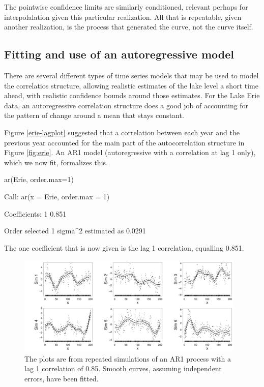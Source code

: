 \documentclass{tufte-book}\usepackage[]{graphicx}\usepackage[]{color}
\begin{document}
The pointwise confidence limits are similarly conditioned, relevant
perhaps for interpolalation given this particular realization.
All that is repeatable, given another realization, is the
process that generated the curve, not the curve itself. 

\subsection{Fitting and use of an autoregressive model}

There are several different types of time series models that
may be used to model the correlatios structure, allowing realistic estimates of the lake level a short time ahead, with realistic
confidence bounds around those estimates.  For the Lake Erie
data, an autoregressive correlation structure does a good job of
accounting for the pattern of change around a mean that stays
constant.

Figure \ref{erie-lagplot} suggested that a correlation between each
year and the previous year accounted for the main part of the
autocorrelation structure in Figure \ref{fig:erie}. An AR1 model
(autoregressive with a correlation at lag 1 only), which we now fit,
formalizes this.
\begin{Schunk}
\begin{Sinput}
ar(Erie, order.max=1)
\end{Sinput}
\begin{Soutput}

Call:
ar(x = Erie, order.max = 1)

Coefficients:
    1  
0.851  

Order selected 1  sigma^2 estimated as  0.0291
\end{Soutput}
\end{Schunk}
The one coefficient that is now given is the lag 1 correlation,
equalling 0.851.

\begin{figure}
\begin{Schunk}


\centerline{\includegraphics[width=0.97\textwidth]{figs/9-arima-sim-1} }

\end{Schunk}
\caption{The plots are from repeated simulations of an AR1 process
with a lag 1 correlation of 0.85.  Smooth curves, assuming independent
  errors, have been fitted.}\label{fig:ar1fits}
\end{figure}
\end{document}

